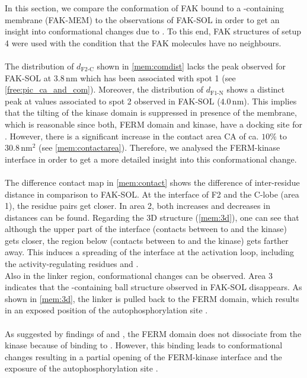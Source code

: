 \label{membrane:chapter}
In this section, we compare the conformation of FAK bound to a \pip{}-containing membrane (FAK-MEM) to the observations of FAK-SOL in order to get an insight into conformational changes due to \pip{}. To this end, FAK structures of setup 4 were used with the condition that the FAK molecules have no neighbours.\\
\\
The distribution of $d_\text{F2-C}$ shown in \autoref{mem:comdist} lacks the peak observed for FAK-SOL at $3.8\,\si{\nano\metre}$ which has been associated with spot 1 (see \autoref{free:pic_ca_and_com}). Moreover, the distribution of $d_\text{F1-N}$ shows a distinct peak at values associated to spot 2 observed in FAK-SOL ($4.0\,\si{\nano\metre}$). This implies that the tilting of the kinase domain is suppressed in presence of the membrane, which is reasonable since both, FERM domain and kinase, have a docking site for \pip{}. However, there is a significant increase in the contact area CA of ca. $10\%$ to $30.8\,\si{\nano\metre}^2$ (see \autoref{mem:contactarea}). Therefore, we analysed the FERM-kinase interface in order to get a more detailed insight into this conformational change.\\
\\
The difference contact map in \autoref{mem:contact} shows the difference of inter-residue distance in comparison to FAK-SOL. At the interface of F2 and the C-lobe (area 1), the residue pairs get closer. In area 2, both increases and decreases in distances can be found. Regarding the 3D structure (\autoref{mem:3d}), one can see that although the upper part of the interface (contacts between  to  and the kinase) gets closer, the region below (contacts between  to  and the kinase) gets farther away. This induces a spreading of the interface at the activation loop, including the activity-regulating residues  and .\\
Also in the linker region, conformational changes can be observed. Area 3 indicates that the -containing ball structure observed in FAK-SOL disappears. As shown in \autoref{mem:3d}, the linker is pulled back to the FERM domain, which results in an exposed position of the autophosphorylation site .\\
\\
As suggested by findings of \textcite{pap001} and \textcite{pap003}, the FERM domain does not dissociate from the kinase because of binding to \pip{}. However, this binding leads to conformational changes resulting in a partial opening of the FERM-kinase interface and the exposure of the autophosphorylation site .
